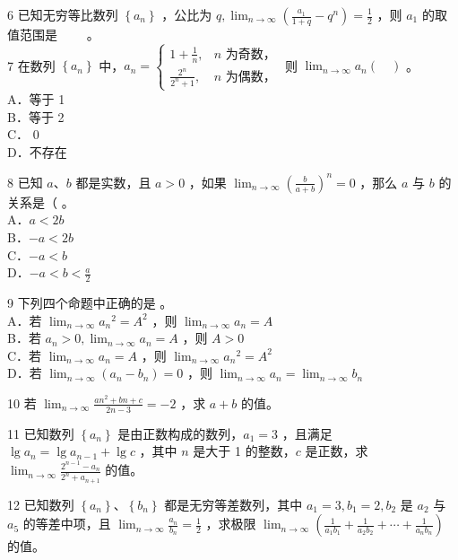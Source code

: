 \documentclass[10pt]{article}
\begin{document}
6 已知无穷等比数列 \(\left\{a_{n}\right\}\) ，公比为 \(q, \lim _{n \rightarrow \infty}\left(\frac{a_{1}}{1+q}-q^{n}\right)=\frac{1}{2}\) ，则 \(a_{1}\) 的取值范围是 \(\qquad\)。\\
7 在数列 \(\left\{a_{n}\right\}\) 中，\(a_{n}=\left\{\begin{array}{ll}1+\frac{1}{n}, & n \text { 为奇数，} \\ \frac{2^{n}}{2^{n}+1}, & n \text { 为偶数，}\end{array}\right.\) 则 \(\lim _{n \rightarrow \infty} a_{n}(\quad)\) 。\\
A．等于 1\\
B．等于 2\\
C． 0\\
D．不存在

8 已知 \(a 、 b\) 都是实数，且 \(a>0\) ，如果 \(\lim _{n \rightarrow \infty}\left(\frac{b}{a+b}\right)^{n}=0\) ，那么 \(a\) 与 \(b\) 的关系是（ 。\\
A．\(a<2 b\)\\
B．\(-a<2 b\)\\
C．\(-a<b\)\\
D．\(-a<b<\frac{a}{2}\)

9 下列四个命题中正确的是 。\\
A．若 \(\lim _{n \rightarrow \infty} a_{n}{ }^{2}=A^{2}\) ，则 \(\lim _{n \rightarrow \infty} a_{n}=A\)\\
B．若 \(a_{n}>0, \lim _{n \rightarrow \infty} a_{n}=A\) ，则 \(A>0\)\\
C．若 \(\lim _{n \rightarrow \infty} a_{n}=A\) ，则 \(\lim _{n \rightarrow \infty} a_{n}{ }^{2}=A^{2}\)\\
D．若 \(\lim _{n \rightarrow \infty}\left(a_{n}-b_{n}\right)=0\) ，则 \(\lim _{n \rightarrow \infty} a_{n}=\lim _{n \rightarrow \infty} b_{n}\)

10 若 \(\lim _{n \rightarrow \infty} \frac{a n^{2}+b n+c}{2 n-3}=-2\) ，求 \(a+b\) 的值。

11 已知数列 \(\left\{a_{n}\right\}\) 是由正数构成的数列，\(a_{1}=3\) ，且满足 \(\lg a_{n}=\lg a_{n-1}+\lg c\) ，其中 \(n\) 是大于 1 的整数，\(c\) 是正数，求 \(\lim _{n \rightarrow \infty} \frac{2^{n-1}-a_{n}}{2^{n}+a_{n+1}}\) 的值。

12 已知数列 \(\left\{a_{n}\right\} 、\left\{b_{n}\right\}\) 都是无穷等差数列，其中 \(a_{1}=3, b_{1}=2, b_{2}\) 是 \(a_{2}\) 与 \(a_{5}\) 的等差中项，且 \(\lim _{n \rightarrow \infty} \frac{a_{n}}{b_{n}}=\frac{1}{2}\) ，求极限 \(\lim _{n \rightarrow \infty}\left(\frac{1}{a_{1} b_{1}}+\frac{1}{a_{2} b_{2}}+\cdots+\frac{1}{a_{n} b_{n}}\right)\) 的值。
\end{document}
